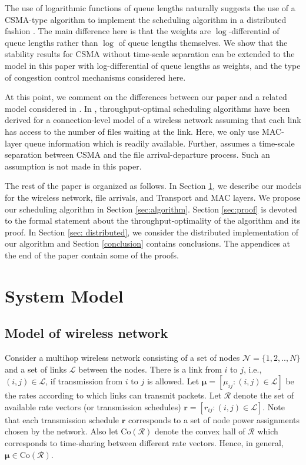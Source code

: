 \documentclass[10pt,onecolumn,draftclsnofoot,journal]{IEEEtran}
\newcommand{\CoR}{\mbox{Co}(\mathcal{R})}
\begin{document}
The use of logarithmic functions of queue lengths naturally suggests the use of a CSMA-type algorithm to implement the scheduling algorithm in a distributed fashion \cite{shah, shah2,ghaderi}. The main difference here is that the weights are $\log$-differential of queue lengths rather than $\log$ of queue lengths themselves. We show that the stability results for CSMA without time-scale separation can be extended to the model in this paper with log-differential of queue lengths as weights, and the type of congestion control mechanisms considered here.

At this point, we comment on the differences between our paper and a related model considered in \cite{bonfeu10}. In \cite{bonfeu10}, throughput-optimal scheduling algorithms have been derived for a connection-level model of a wireless network assuming that each link has access to the number of files waiting at the link. Here, we only use MAC-layer queue information which is readily available. Further, \cite{bonfeu10} assumes a time-scale separation between CSMA and the file arrival-departure process. Such an assumption is not made in this paper.

The rest of the paper is organized as follows.
In Section \ref{sec:system}, we describe our models for the wireless network, file arrivals, and Transport and MAC layers.
We propose our scheduling algorithm in Section \ref{sec:algorithm}. Section \ref{sec:proof} is devoted to the formal statement about the throughput-optimality of the algorithm and its proof. In Section \ref{sec: distributed}, we consider the distributed implementation of our algorithm and Section \ref{conclusion} contains conclusions. The appendices at the end of the paper contain some of the proofs.

\section{System Model}\label{sec:system}
\subsection*{Model of wireless network}
Consider a multihop wireless network consisting of a set of nodes $\mathcal{N}=\{1,2,..,N\}$ and a set of links $\mathcal{L}$ between the nodes. There is a link from $i$ to $j$, i.e.,
$(i,j) \in \mathcal{L}$, if transmission from $i$ to $j$ is allowed. Let $\mathbf{\mu}=[\mu_{ij}: (i,j) \in \mathcal{L}]$ be the rates according to which
links can transmit packets. Let $\mathcal{R}$ denote the set of available rate vectors (or transmission schedules) $\mathbf{r}=[r_{ij}: (i,j) \in \mathcal{L}]$.
Note that each transmission schedule $\mathbf{r}$ corresponds to a set of node power assignments chosen by the network. Also let $\mbox{Co}(\mathcal{R})$ denote the
convex hall of $\mathcal{R}$ which corresponds to time-sharing between different rate vectors. Hence, in general, $\mathbf{\mu} \in \CoR$.
\end{document}
